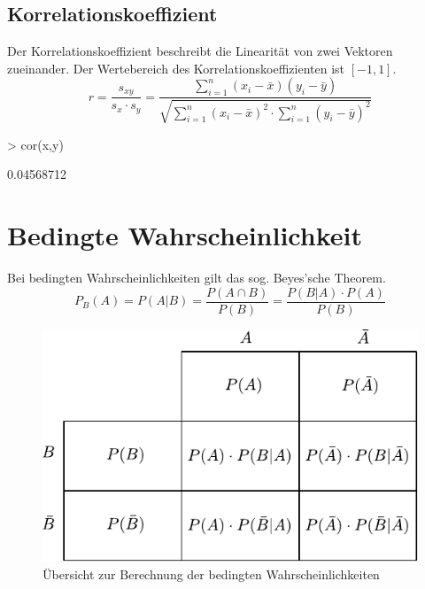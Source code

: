 \subsection{Korrelationskoeffizient}
Der Korrelationskoeffizient beschreibt die Linearität von zwei Vektoren 
zueinander. Der Wertebereich des Korrelationskoeffizienten ist $[-1, 1]$. 
\[ r = \frac{s_{xy}}{s_x \cdot s_y} 
= \frac{\sum\limits_{i=1}^{n} (x_i - \bar{x}) (y_i - \bar{y})}
{\sqrt{\sum\limits_{i=1}^{n} (x_i - \bar{x})^2  \cdot 
\sum\limits_{i=1}^{n} (y_i - \bar{y})^2 }} \]
\begin{Schunk}
\begin{Sinput}
> cor(x,y)
\end{Sinput}
\begin{Soutput}
[1] 0.04568712
\end{Soutput}
\end{Schunk}

\section{Bedingte Wahrscheinlichkeit}
Bei bedingten Wahrscheinlichkeiten gilt das sog. Beyes'sche Theorem.
\[ \boxed{ P_B(A) = P(A|B) = \frac{P(A \cap B)}{P(B)} = \frac{P(B|A)\cdot P(A)}{P(B)} } \]

\begin{figure}[h!]
        \centering
        \includegraphics[scale=\graphscale]{bedingte-wahrscheinlichkeit.pdf}
        \caption{Übersicht zur Berechnung der bedingten Wahrscheinlichkeiten}
\end{figure}

